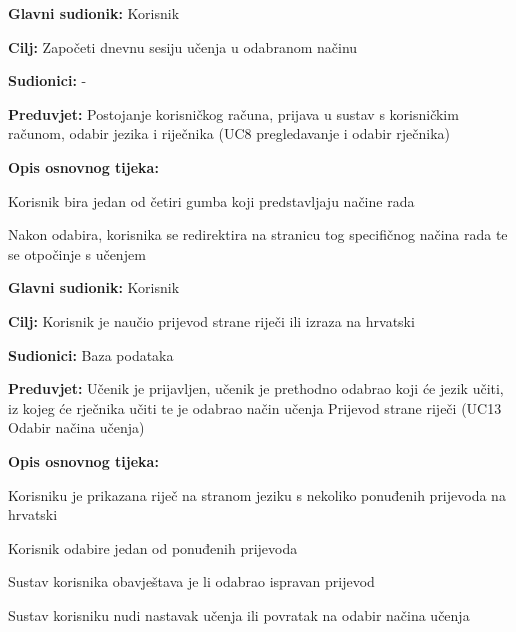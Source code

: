\noindent {}
\begin{packed_item}

	\item \textbf{Glavni sudionik: } Korisnik
	\item \textbf{Cilj: } Započeti dnevnu sesiju učenja u odabranom načinu
	\item \textbf{Sudionici: } -
	\item \textbf{Preduvjet: } Postojanje korisničkog računa, prijava u sustav s korisničkim računom, odabir jezika i riječnika (UC8 pregledavanje i odabir rječnika)
	\item  \textbf{Opis osnovnog tijeka:}
	
	\item[] \begin{packed_enum}
		
		\item Korisnik bira jedan od četiri gumba koji predstavljaju načine rada
		\item Nakon odabira, korisnika se redirektira na stranicu tog specifičnog
		načina rada te se otpočinje s učenjem

	\end{packed_enum}

	
\end{packed_item}




\noindent {}
\begin{packed_item}

	\item \textbf{Glavni sudionik: } Korisnik
	\item \textbf{Cilj: } Korisnik je naučio prijevod strane riječi ili izraza na hrvatski
	\item \textbf{Sudionici: } Baza podataka
	\item \textbf{Preduvjet: } Učenik je prijavljen, učenik je prethodno odabrao koji će jezik učiti, iz kojeg će rječnika učiti te je odabrao način učenja Prijevod strane riječi (UC13 Odabir načina učenja)
	\item  \textbf{Opis osnovnog tijeka:}
	
	\item[] \begin{packed_enum}
		
		\item Korisniku je prikazana riječ na stranom jeziku s nekoliko ponuđenih prijevoda na hrvatski
		\item Korisnik odabire jedan od ponuđenih prijevoda
		\item Sustav korisnika obavještava je li odabrao ispravan prijevod
		\item Sustav korisniku nudi nastavak učenja ili povratak na odabir načina učenja

	\end{packed_enum}

\end{packed_item}


